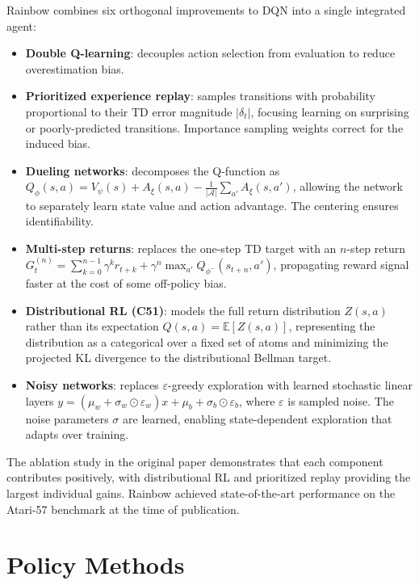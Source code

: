 \documentclass[11pt, letterpaper]{article}
\begin{document}
\begin{concept}
    Rainbow combines six orthogonal improvements to DQN into a single integrated agent:
    \begin{itemize}
        \item \textbf{Double Q-learning}: decouples action selection from evaluation to reduce overestimation bias.
        \item \textbf{Prioritized experience replay}: samples transitions with probability proportional to their TD error magnitude \(|\delta_t|\), focusing learning on surprising or poorly-predicted transitions. Importance sampling weights correct for the induced bias.
        \item \textbf{Dueling networks}: decomposes the Q-function as \(Q_\phi(s, a) = V_\psi(s) + A_\xi(s, a) - \frac{1}{|\mathcal{A}|}\sum_{a'} A_\xi(s, a')\), allowing the network to separately learn state value and action advantage. The centering ensures identifiability.
        \item \textbf{Multi-step returns}: replaces the one-step TD target with an \(n\)-step return \(G_t^{(n)} = \sum_{k=0}^{n-1} \gamma^k r_{t+k} + \gamma^n \max_{a'} Q_{\phi^-}(s_{t+n}, a')\), propagating reward signal faster at the cost of some off-policy bias.
        \item \textbf{Distributional RL (C51)}: models the full return distribution \(Z(s, a)\) rather than its expectation \(Q(s,a) = \mathbb{E}[Z(s,a)]\), representing the distribution as a categorical over a fixed set of atoms and minimizing the projected KL divergence to the distributional Bellman target.
        \item \textbf{Noisy networks}: replaces \(\varepsilon\)-greedy exploration with learned stochastic linear layers \(y = (\mu_w + \sigma_w \odot \varepsilon_w) x + \mu_b + \sigma_b \odot \varepsilon_b\), where \(\varepsilon\) is sampled noise. The noise parameters \(\sigma\) are learned, enabling state-dependent exploration that adapts over training.
    \end{itemize}
    The ablation study in the original paper demonstrates that each component contributes positively, with distributional RL and prioritized replay providing the largest individual gains. Rainbow achieved state-of-the-art performance on the Atari-57 benchmark at the time of publication.
\end{concept}

\newpage
\section{Policy Methods}
\end{document}

